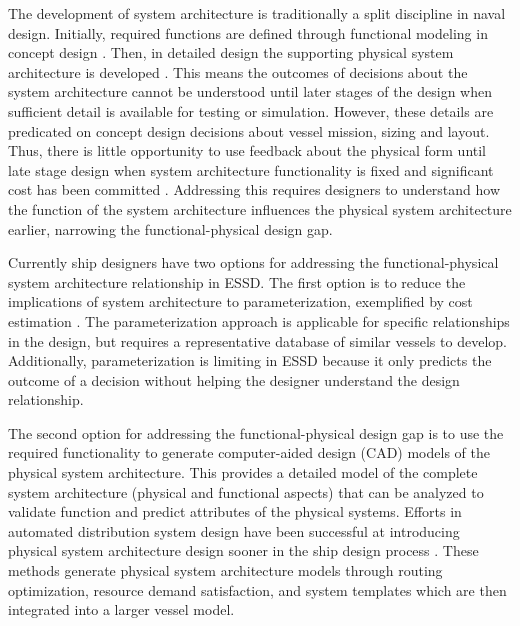 \documentclass[preprint,12pt]{elsarticle}
\begin{document}
The development of system architecture is traditionally a split discipline in naval design. Initially, required functions are defined through functional modeling in concept design \citep{Andrews1981,Chandrasegaran2013,Brown2015,Chalfant2015}. Then, in detailed design the supporting physical system architecture is developed \citep{Chandrasegaran2013}. This means the outcomes of decisions about the system architecture cannot be understood until later stages of the design when sufficient detail is available for testing or simulation. However, these details are predicated on concept design decisions about vessel mission, sizing and layout. Thus, there is little opportunity to use feedback about the physical form until late stage design when system architecture functionality is fixed and significant cost has been committed \citep{Ullman1992,Mavris2000a,Kassel2010}. Addressing this requires designers to understand how the function of the system architecture influences the physical system architecture earlier, narrowing the functional-physical design gap.


Currently ship designers have two options for addressing the functional-physical system architecture relationship in ESSD. The first option is to reduce the implications of system architecture to parameterization, exemplified by cost estimation \citep{Watson1977,Ross2004}. The parameterization approach is applicable for specific relationships in the design, but requires a representative database of similar vessels to develop. Additionally, parameterization is limiting in ESSD because it only predicts the outcome of a decision without helping the designer understand the design relationship.

The second option for addressing the functional-physical design gap is to use the required functionality to generate computer-aided design (CAD) models of the physical system architecture. This provides a detailed model of the complete system architecture (physical and functional aspects) that can be analyzed to validate function and predict attributes of the physical systems. Efforts in automated distribution system design have been successful at introducing physical system architecture design sooner in the ship design process \citep{Fiedel2011,Chalfant2012,Chalfant2014,Chalfant2015,Chryssostomidis2015,Trapp2015,Dougal2016}. These methods generate physical system architecture models through routing optimization, resource demand satisfaction, and system templates which are then integrated into a larger vessel model. 
\end{document}
